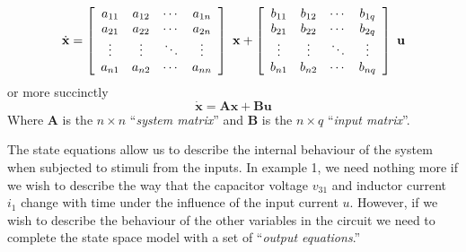 \begin{slide}\label{slides:l13s4}
\[
\dot{\mathbf{x}}=\left[\begin{array}{cccc}
  a_{11} & a_{12} & \cdots & a_{1n} \\
  a_{21} & a_{22} & \cdots & a_{2n} \\
  \vdots & \vdots & \ddots & \vdots \\
  a_{n1} & a_{n2} & \cdots & a_{nn}
\end{array}\right]\ \mathbf{x} + \left[\begin{array}{cccc}
  b_{11} & b_{12} & \cdots & b_{1q} \\
  b_{21} & b_{22} & \cdots & b_{2q} \\
  \vdots & \vdots & \ddots & \vdots \\
  b_{n1} & b_{n2} & \cdots & b_{nq}
\end{array}\right]\ \mathbf{u} \\
\]
or more succinctly
\[
\dot{\mathbf{x}}=\mathbf{A}\mathbf{x}+\mathbf{B}\mathbf{u}
\]
Where $\mathbf{A}$ is the $n\times n$ ``\emph{system matrix}'' and
$\mathbf{B}$ is the $n\times q$ ``\emph{input matrix}''.
\end{slide}


The state equations allow us to describe the internal behaviour of
the system when subjected to stimuli from the inputs. In 
example 1, we need nothing more if we wish to describe the way that
the capacitor voltage $v_{31}$ and inductor current $i_1$ change
with time under the influence of the input current $u$. However,
if we wish to describe the behaviour of the other variables in the
circuit we need to complete the state space model with a set of
``\emph{output equations}.''

